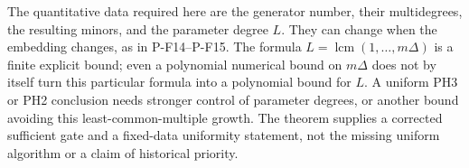 The quantitative data required here are the generator number, their
multidegrees, the resulting minors, and the parameter degree $L$.
They can change when the embedding changes, as in P-F14--P-F15.
The formula $L=\operatorname{lcm}(1,\ldots,m\Delta)$ is a finite
explicit bound; even a polynomial numerical bound on $m\Delta$
does not by itself turn this particular formula into a polynomial
bound for $L$. A uniform PH3 or PH2 conclusion needs stronger control
of parameter degrees, or another bound avoiding this least-common-multiple
growth. The theorem supplies a corrected sufficient gate and a fixed-data
uniformity statement, not the missing uniform algorithm or a claim of
historical priority.
